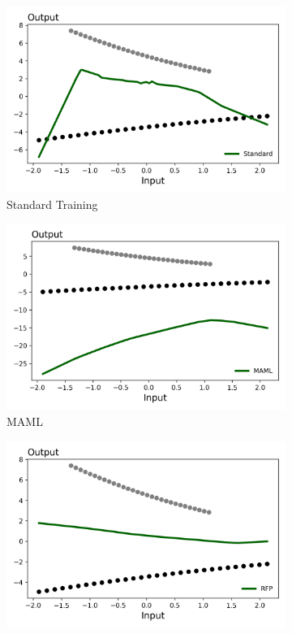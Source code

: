 \documentclass[a4paper,12pt]{article}
\begin{document}
\begin{figure}[htbp]
\centering
\begin{subfigure}{.32\textwidth}
    \centering
    \includegraphics[width=.95\linewidth]{figures/framework/grad_desc_toy_Standard.png}
    \caption{Standard Training}
\end{subfigure}
\begin{subfigure}{.32\textwidth}
    \centering
    \includegraphics[width=.95\linewidth]{figures/framework/grad_desc_toy_MAML.png}
        \caption{MAML}
\end{subfigure}
\begin{subfigure}{.32\textwidth}
    \centering
    \includegraphics[width=.95\linewidth]{figures/framework/grad_desc_toy_RFP.png}

\end{subfigure}
\end{figure}
\end{document}
